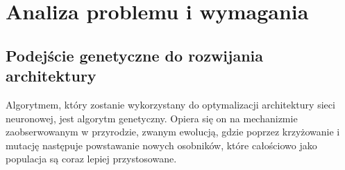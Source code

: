 \section{Analiza problemu i wymagania}
\subsection{Podejście genetyczne do rozwijania architektury}
Algorytmem, który zostanie wykorzystany do optymalizacji
architektury sieci neuronowej, jest algorytm genetyczny.
Opiera się on na mechanizmie zaobserwowanym w przyrodzie,
zwanym ewolucją, gdzie poprzez krzyżowanie i mutację
następuje powstawanie nowych osobników,
które całościowo jako populacja są coraz lepiej przystosowane.